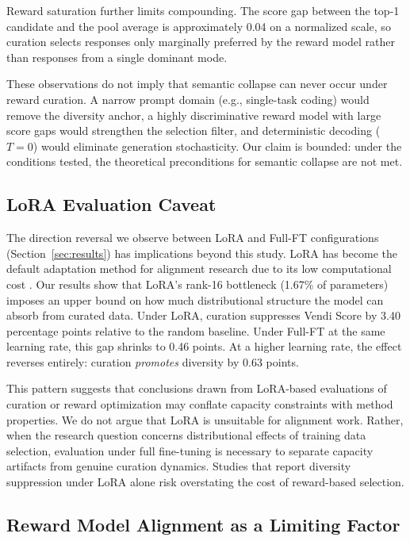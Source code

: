 Reward saturation further limits compounding. The score gap between the top-1 candidate and the pool average is approximately 0.04 on a normalized scale, so curation selects responses only marginally preferred by the reward model rather than responses from a single dominant mode.

These observations do not imply that semantic collapse can never occur under reward curation. A narrow prompt domain (e.g., single-task coding) would remove the diversity anchor, a highly discriminative reward model with large score gaps would strengthen the selection filter, and deterministic decoding ($T{=}0$) would eliminate generation stochasticity. Our claim is bounded: under the conditions tested, the theoretical preconditions for semantic collapse are not met.

\subsection{LoRA Evaluation Caveat}

The direction reversal we observe between LoRA and Full-FT configurations (Section~\ref{sec:results}) has implications beyond this study. LoRA has become the default adaptation method for alignment research due to its low computational cost \cite{placeholder_hu2022lora}. Our results show that LoRA's rank-16 bottleneck (1.67\% of parameters) imposes an upper bound on how much distributional structure the model can absorb from curated data. Under LoRA, curation suppresses Vendi Score by 3.40 percentage points relative to the random baseline. Under Full-FT at the same learning rate, this gap shrinks to 0.46 points. At a higher learning rate, the effect reverses entirely: curation \emph{promotes} diversity by 0.63 points.

This pattern suggests that conclusions drawn from LoRA-based evaluations of curation or reward optimization may conflate capacity constraints with method properties. We do not argue that LoRA is unsuitable for alignment work. Rather, when the research question concerns distributional effects of training data selection, evaluation under full fine-tuning is necessary to separate capacity artifacts from genuine curation dynamics. Studies that report diversity suppression under LoRA alone risk overstating the cost of reward-based selection.

\subsection{Reward Model Alignment as a Limiting Factor}

